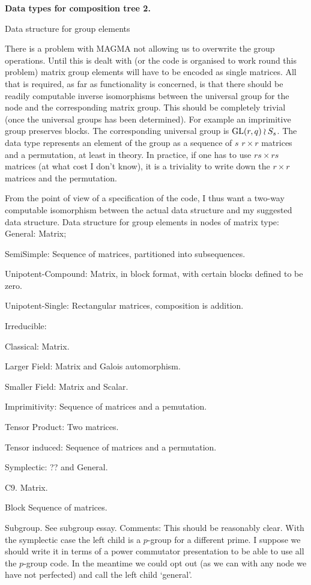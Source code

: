 \def\q{\quad}
\def\GL{{\rm GL}}
\centerline{\bf Data types for composition tree 2.}
\medskip
\centerline{Data structure for group elements}
\medskip
There is a problem with MAGMA not allowing us to overwrite the group operations.
Until this is dealt with (or the code is organised to work round this problem) matrix group
elements will have to be encoded as single matrices.  All that is required, as far as
functionality is concerned, is that there should be readily computable inverse isomorphisms
between the universal group for the node and the corresponding matrix group.  This should be
completely trivial (once the universal groups has been determined).
For example an imprimitive group preserves blocks.  The corresponding universal group is
$\GL(r,q)\wr S_s$.  The data type represents an element of the group as a sequence of $s$
$r\times r$ matrices and a permutation, at least in theory.  In practice, if one has to use $rs\times rs$
matrices (at what cost I don't know), it is a triviality to write down the $r\times r$ matrices and the
permutation.

From the point of view of a specification of the code, I thus want a two-way computable isomorphism
between the actual data structure and my suggested data structure.
\medskip
Data structure for group elements in nodes of matrix type:
\medskip
General: Matrix;

SemiSimple: Sequence of matrices, partitioned into subsequences.

Unipotent-Compound:  Matrix, in block format, with certain blocks defined to be zero.

Unipotent-Single:  Rectangular matrices, composition is addition.

Irreducible:

\q Classical:  Matrix.

\q Larger Field:  Matrix and Galois automorphism.

\q Smaller Field:  Matrix and Scalar.

\q Imprimitivity:  Sequence of matrices and a pemutation.

\q Tensor Product:  Two matrices.

\q Tensor induced:  Sequence of matrices and a permutation.

\q Symplectic:  ?? and General.

\q C9.  Matrix.

Block  Sequence of matrices.

Subgroup.  See subgroup essay.
\medskip
Comments:  This should be reasonably clear.  With the symplectic case the left child
is a $p$-group for a different prime.  I suppose we should write it in terms of a power commutator
presentation to be able to use all the $p$-group code.  In the meantime we could opt out
(as we can with any node we have not perfected) and call the left child `general'.
\bye

